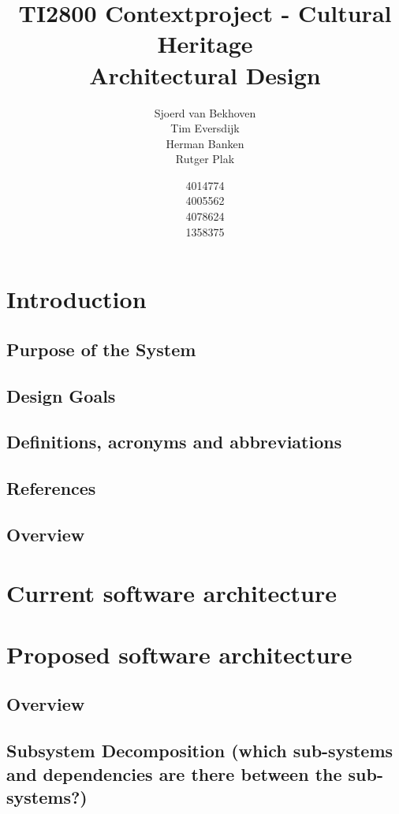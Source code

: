\documentclass{article}
\begin{document}
\title{TI2800 Contextproject - Cultural Heritage \\ Architectural Design}
\author{Sjoerd van Bekhoven \\ Tim Eversdijk \\ Herman Banken \\ Rutger Plak \and 4014774 \\ 4005562 \\ 4078624 \\ 1358375}
\maketitle

\section{Introduction}
\subsection{Purpose of the System}
\subsection{Design Goals}
\subsection{Definitions, acronyms and abbreviations}
\subsection{References}
\subsection{Overview}
\section{Current software architecture}
\section{Proposed software architecture}
\subsection{Overview}
\subsection{Subsystem Decomposition (which sub-systems and dependencies are there
between the sub-systems?)}
\end{document}
